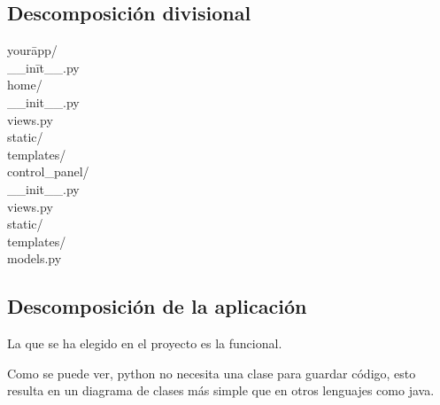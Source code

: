\subsection{Descomposición divisional}

\begin{tabbing}
your\= app/ \\
\> \_\_in\= it\_\_.py \\
\> home/ \\
\> \> \_\_init\_\_.py \\
\> \> views.py \\
\> \> static/ \\
\> \> templates/ \\
\> control\_panel/ \\
\> \> \_\_init\_\_.py \\
\> \> views.py \\
\> \> static/ \\
\> \> templates/ \\
\> models.py \\
\end{tabbing}

\subsection{Descomposición de la aplicación}
La que se ha elegido en el proyecto es la funcional. 

Como se puede ver, python no necesita una clase para guardar código, esto resulta en un diagrama de clases más simple que en otros lenguajes como java.



